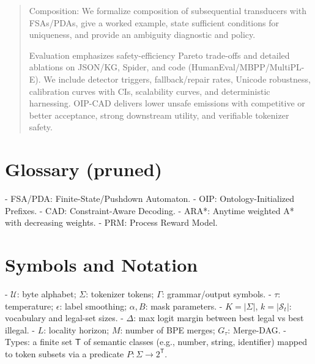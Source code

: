 \documentclass{article}
\begin{document}
\begin{abstract}
Composition: We formalize composition of subsequential transducers with FSAs/PDAs, give a worked example, state sufficient conditions for uniqueness, and provide an ambiguity diagnostic and policy.

Evaluation emphasizes safety-efficiency Pareto trade-offs and detailed ablations on JSON/KG, Spider, and code (HumanEval/MBPP/MultiPL-E). We include detector triggers, fallback/repair rates, Unicode robustness, calibration curves with CIs, scalability curves, and deterministic harnessing. OIP-CAD delivers lower unsafe emissions with competitive or better acceptance, strong downstream utility, and verifiable tokenizer safety.
\end{abstract}

\section*{Glossary (pruned)}
- FSA/PDA: Finite-State/Pushdown Automaton.
- OIP: Ontology-Initialized Prefixes.
- CAD: Constraint-Aware Decoding.
- ARA*: Anytime weighted A* with decreasing weights.
- PRM: Process Reward Model.

\section*{Symbols and Notation}
- $\mathcal{U}$: byte alphabet; $\Sigma$: tokenizer tokens; $\Gamma$: grammar/output symbols.
- $\tau$: temperature; $\epsilon$: label smoothing; $\alpha,B$: mask parameters.
- $K=|\Sigma|$, $k=|\mathcal{S}_t|$: vocabulary and legal-set sizes.
- $\Delta$: max logit margin between best legal vs best illegal.
- $L$: locality horizon; $M$: number of BPE merges; $G_\tau$: Merge-DAG.
- Types: a finite set $\mathsf{T}$ of semantic classes (e.g., number, string, identifier) mapped to token subsets via a predicate $P:\Sigma\to 2^{\mathsf{T}}$.
\end{document}
